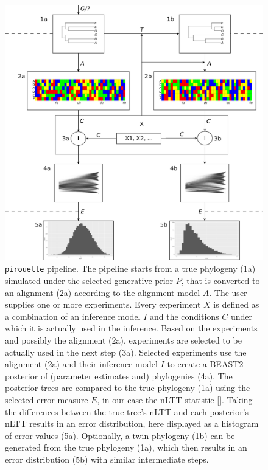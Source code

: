 \documentclass{article}
\begin{document}
\begin{figure}
  \centering
  \includegraphics[width=\textwidth]{workflow.png}
  \caption{
    \texttt{pirouette} pipeline. 
    The pipeline starts from a true phylogeny (1a) simulated under the selected generative prior $\mathit{P}$, that is converted to an alignment (2a) according to the alignment model $\mathit{A}$. The user supplies one or more experiments. Every experiment $\mathit{X}$ is defined as a combination of an inference model $\mathit{I}$ and the conditions $\mathit{C}$ under which it is actually used in the inference. Based on the experiments and possibly the alignment (2a), experiments are selected to be actually used in the next step (3a).
    Selected experiments use the alignment (2a) and their inference model $\mathit{I}$ to create a BEAST2 posterior of (parameter estimates and) phylogenies (4a). The posterior trees are compared to the true phylogeny (1a) using the selected error measure $\mathit{E}$, in our case the nLTT statistic [\cite{janzen2015approximate}]. Taking the differences between the true tree's nLTT and each posterior's nLTT results in an error distribution, here displayed as a histogram
    of error values (5a). Optionally, a twin phylogeny (1b) can be generated from the true phylogeny (1a), which then results in an error distribution (5b) with similar intermediate steps.
  }
  \label{fig:pipeline}
\end{figure}
\end{document}
